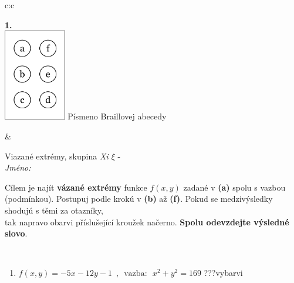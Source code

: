 \documentclass[10pt]{report}
\begin{document}
\begin{tabular}{c:c}
\begin{minipage}[c][104.5mm][t]{0.5\linewidth}
\begin{center}
\begin{minipage}{0.79\linewidth}
\begin{center}
\begin{varwidth}{\linewidth}
\begin{enumerate}
\end{enumerate}
\end{varwidth}
\end{center}
\end{minipage}
\begin{minipage}{0.20\linewidth}
\begin{center}
{\Huge\bfseries 1.} \\[2mm]
\includegraphics[height=40mm]{../images/braille.png}
{\small Písmeno Braillovej abecedy}
\end{center}
\end{minipage}
\end{center}
\end{minipage}
&
\begin{minipage}[c][104.5mm][t]{0.5\linewidth}
\begin{center}
\vspace{7mm}
{\huge Viazané extrémy, skupina \textit{Xi $\xi$} -}\\[5mm]
\textit{Jméno:}\phantom{xxxxxxxxxxxxxxxxxxxxxxxxxxxxxxxxxxxxxxxxxxxxxxxxxxxxxxxxxxxxxxxxx}\\[5mm]
\begin{minipage}{0.95\linewidth}
\begin{center}
Cílem je najít \textbf{vázané extrémy} funkce $f(x,y)$ zadané v \textbf{(a)} spolu s vazbou (podmínkou). Postupuj podle krokú v \textbf{(b)} až \textbf{(f)}. Pokud se medzivýsledky shodujú s těmi za otazníky,\\tak napravo obarvi příslušející kroužek načerno. \textbf{Spolu odevzdejte výsledné slovo}.
\end{center}
\end{minipage}
\\[1mm]
\begin{minipage}{0.79\linewidth}
\begin{center}
\begin{varwidth}{\linewidth}
\begin{enumerate}
\normalsize
\item $f(x,y)=-5x-12y-1 \enspace , \enspace \mathrm{vazba:} \enspace x^2+y^2=169$\quad \dotfill\; ???\;\dotfill \quad vybarvi

\end{enumerate}
\end{varwidth}
\end{center}
\end{minipage}
\end{center}
\end{minipage}
\end{tabular}
\end{document}
